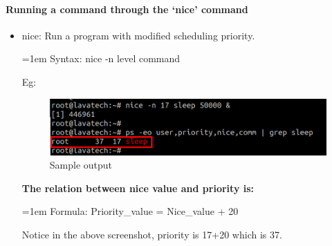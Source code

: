 \begin{flushleft}
\begin{itemize}
\end{itemize}



\paragraph{Running a command through the ‘nice’ command}
\begin{itemize}
	\item nice: Run a program with modified scheduling priority.
	\bigskip
	\begin{tcolorbox}[breakable,notitle,boxrule=-0pt,colback=pink,colframe=pink]
		\color{black}
		\font=1em
		Syntax: nice -n level command
		\font=4pt
	\end{tcolorbox}	
	 Eg:
 	\begin{figure}[h!]
	 	\centering
	 	\includegraphics[scale=.4]{content/chapter12/images/noce_2.png}
	 	\caption{Sample output}
	 	\label{fig:cpu5893}
	 \end{figure}
	 
	 \textbf{The relation between nice value and priority is:}
	 \bigskip
	 \begin{tcolorbox}[breakable,notitle,boxrule=-0pt,colback=pink,colframe=pink]
	 	\color{black}
	 	\font=1em
	 	Formula: Priority\_value = Nice\_value + 20
	 	\font=4pt
	 \end{tcolorbox}	 
 	Notice in the above screenshot, priority is 17+20 which is 37.
\end{itemize}

\newpage

\end{flushleft}
